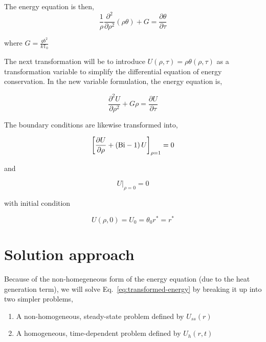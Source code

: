 The energy equation is then,
\begin{equation}
    \frac{1}{\rho}\frac{\partial^2}{\partial \rho^2}(\rho\theta) + G = \frac{\partial\theta}{\partial \tau}
\end{equation}

where $G = \frac{gb^2}{k\mathbb{T}_0}$

The next transformation will be to introduce $U(\rho,\tau) = \rho\theta(\rho,\tau)$ as a transformation variable to simplify the differential equation of energy conservation. In the new variable formulation, the energy equation is,

\begin{equation}\label{eq:transformed-energy}
    \frac{\partial^2 U}{\partial \rho^2} + G\rho = \frac{\partial U}{\partial \tau}
\end{equation}

The boundary conditions are likewise transformed into,

\begin{equation}\label{eq:transformed-bc-1}
    \left[\frac{\partial U}{\partial \rho} + \left(\mathrm{Bi}-1\right)U\right]_{\rho = 1}= 0
\end{equation}

and

\begin{equation}\label{eq:transformed-bc-2}
    U\big|_{\rho=0} = 0
\end{equation}

with initial condition

\begin{equation}\label{eq:transformed-ic}
    U(\rho,0) = U_0 = \theta_0 r^* = r^*
\end{equation}




\section{Solution approach}

Because of the non-homegeneous form of the energy equation (due to the heat generation term), we will solve Eq.~\ref{eq:transformed-energy} by breaking it up into two simpler problems, 

\begin{enumerate}
\item A non-homogeneous, steady-state problem defined by $U_{ss}(r)$
\item A homogeneous, time-dependent problem defined by $U_h(r,t)$
\end{enumerate}

